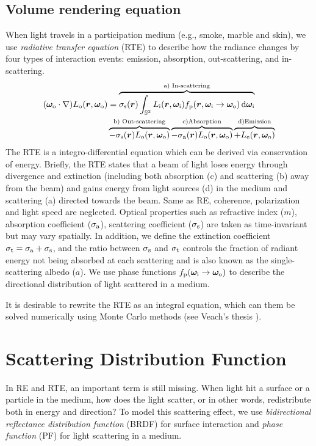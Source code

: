 \subsection{Volume rendering equation}
When light travels in a participation medium (e.g., smoke, marble and skin), we use \emph{radiative transfer equation} (RTE) \cite{chandrasekhar1960radiative} to describe how the radiance changes by four types of interaction events: emission, absorption, out-scattering, and in-scattering.
\begin{align}
	(\bm\omega_\mathrm{o}\cdot\nabla) L_\mathrm{o}(\bm{r},\bm\omega_\mathrm{o}) &= 
	\overbrace{\sigma_\mathrm{s}(\bm{r}) \int_{\mathbb{S}^2} L_\mathrm{i}(\bm{r},\bm\omega_\mathrm{i})f_\mathrm{p}(\bm{r},\bm\omega_\mathrm{i}\rightarrow\bm\omega_\mathrm{o}) \,\mathrm{d}\bm\omega_\mathrm{i}}^{\text{a) In-scattering}} \\
	& \overbrace{-\sigma_\mathrm{s}(\bm{r})L_\mathrm{o}(\bm{r},\bm\omega_\mathrm{o})}^{\text{b) Out-scattering}}
	\overbrace{-\sigma_\mathrm{a}(\bm{r})L_\mathrm{o}(\bm{r},\bm\omega_\mathrm{o})}^{\mathrm{c) Absorption}}
	\overbrace{+L_\mathrm{e}(\bm{r},\bm\omega_\mathrm{o})}^{\mathrm{d) Emission}}
\end{align}
The RTE is a integro-differential equation which can be derived via conservation of energy. Briefly, the RTE states that a beam of light loses energy through divergence and extinction (including both absorption (c) and scattering (b) away from the beam) and gains energy from light sources (d) in the medium and scattering (a) directed towards the beam. Same as RE, coherence, polarization and light speed are neglected. Optical properties such as refractive index ($m$), absorption coefficient ($\sigma_\mathrm{a}$), scattering coefficient ($\sigma_\mathrm{s}$) are taken as time-invariant but may vary spatially. In addition, we define the extinction coefficient $\sigma_\mathrm{t} = \sigma_\mathrm{a} + \sigma_\mathrm{s}$, and the ratio between $\sigma_\mathrm{s}$ and $\sigma_\mathrm{t}$ controls the fraction of radiant energy not being absorbed at each scattering and is also known as the single-scattering albedo ($a$). We use phase functions $f_\mathrm{p}(\bm\omega_\mathrm{i}\rightarrow\bm\omega_\mathrm{o})$ to describe the directional distribution of light scattered in a medium.

It is desirable to rewrite the RTE as an integral equation, which can them be solved numerically using Monte Carlo methods (see Veach's thesis 
\cite{veach1997metropolis}). 

\section{Scattering Distribution Function}
In RE and RTE, an important term is still missing. When light hit a surface or a particle in the medium, how does the light scatter, or in other words, redistribute both in energy and direction? To model this scattering effect, we use \emph{bidirectional reflectance distribution function} (BRDF) for surface interaction and \emph{phase function} (PF) for light scattering in a medium.

